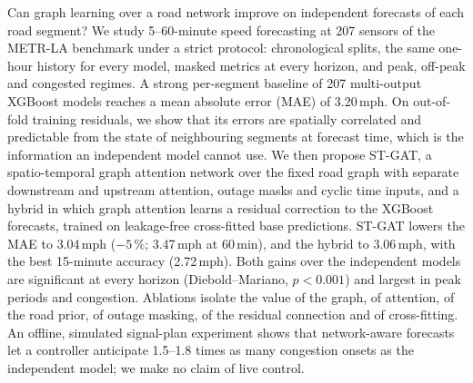 Can graph learning over a road network improve on independent forecasts of each road
segment? We study 5--60-minute speed forecasting at 207 sensors of the METR-LA
benchmark under a strict protocol: chronological splits, the same one-hour history
for every model, masked metrics at every horizon, and peak, off-peak and congested
regimes. A strong per-segment baseline of 207 multi-output XGBoost models reaches a
mean absolute error (MAE) of 3.20\,mph. On out-of-fold training residuals, we show
that its errors are spatially correlated and predictable from the state of
neighbouring segments at forecast time, which is the information an independent
model cannot use. We then propose ST-GAT, a spatio-temporal graph attention network
over the fixed road graph with separate downstream and upstream attention,
outage masks and cyclic time inputs, and a hybrid in which graph attention learns a
residual correction to the XGBoost forecasts, trained on leakage-free cross-fitted
base predictions. ST-GAT lowers the MAE to 3.04\,mph ($-5\,\%$; 3.47\,mph at
60\,min), and the hybrid to 3.06\,mph, with the best 15-minute accuracy
(2.72\,mph).
Both gains over the independent models are significant at every horizon
(Diebold--Mariano, $p<0.001$) and largest in peak periods and congestion. Ablations
isolate the value of the graph, of attention, of the road prior, of outage masking,
of the residual connection and of cross-fitting. An offline, simulated signal-plan
experiment shows that network-aware forecasts let a controller anticipate 1.5--1.8
times as many congestion onsets as the independent model; we make no claim of live
control.
